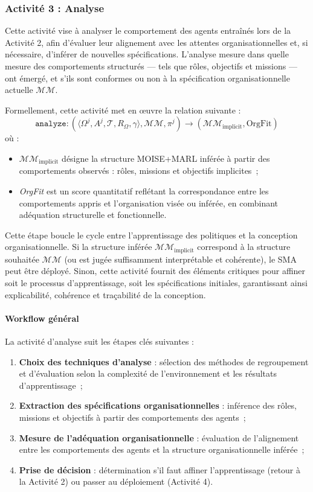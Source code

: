 \subsubsection{Activité 3 : Analyse}

Cette activité vise à analyser le comportement des agents entraînés lors de la Activité 2, afin d'évaluer leur alignement avec les attentes organisationnelles et, si nécessaire, d'inférer de nouvelles spécifications. L'analyse mesure dans quelle mesure des comportements structurés — tels que rôles, objectifs et missions — ont émergé, et s'ils sont conformes ou non à la spécification organisationnelle actuelle $\mathcal{MM}$.

Formellement, cette activité met en œuvre la relation suivante :
\[
    \texttt{analyze}: \left( \langle \Omega^j, A^j, \mathcal{T}, R_{\Omega}, \gamma \rangle, \mathcal{MM}, \pi^j \right) \longrightarrow (\mathcal{MM}_{\text{implicit}}, \text{OrgFit})
\]
où :
\begin{itemize}
    \item $\mathcal{MM}_{\text{implicit}}$ désigne la structure MOISE+MARL inférée à partir des comportements observés : rôles, missions et objectifs implicites~;
    \item \textit{OrgFit} est un score quantitatif reflétant la correspondance entre les comportements appris et l'organisation visée ou inférée, en combinant adéquation structurelle et fonctionnelle.
\end{itemize}

Cette étape boucle le cycle entre l'apprentissage des politiques et la conception organisationnelle. Si la structure inférée $\mathcal{MM}_{\text{implicit}}$ correspond à la structure souhaitée $\mathcal{MM}$ (ou est jugée suffisamment interprétable et cohérente), le SMA peut être déployé. Sinon, cette activité fournit des éléments critiques pour affiner soit le processus d'apprentissage, soit les spécifications initiales, garantissant ainsi explicabilité, cohérence et traçabilité de la conception.

\paragraph{Workflow général}

La activité d'analyse suit les étapes clés suivantes :
\begin{enumerate}
    \item \textbf{Choix des techniques d'analyse} : sélection des méthodes de regroupement et d'évaluation selon la complexité de l'environnement et les résultats d'apprentissage~;
    \item \textbf{Extraction des spécifications organisationnelles} : inférence des rôles, missions et objectifs à partir des comportements des agents~;
    \item \textbf{Mesure de l'adéquation organisationnelle} : évaluation de l'alignement entre les comportements des agents et la structure organisationnelle inférée~;
    \item \textbf{Prise de décision} : détermination s'il faut affiner l'apprentissage (retour à la Activité 2) ou passer au déploiement (Activité 4).
\end{enumerate}

